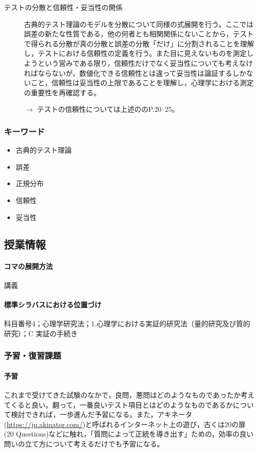 \begin{description}
\item[テストの分散と信頼性・妥当性の関係]古典的テスト理論のモデルを分散について同様の式展開を行う。ここでは誤差の新たな性質である，他の何者とも相関関係にないことから，テストで得られる分散が真の分散と誤差の分散「だけ」に分割されることを理解し，テストにおける信頼性の定義を行う。また目に見えないものを測定しようという営みである限り，信頼性だけでなく妥当性についても考えなければならないが，数値化できる信頼性とは違って妥当性は論証するしかないこと，信頼性は妥当性の上限であることを理解し，心理学における測定の重要性を再確認する。
\begin{flushright}
    $\to$ テストの信頼性については上述の\citet{kosugi2016b}のP.20--25。
\end{flushright}

\end{description}
\subsubsection{キーワード}
\begin{itemize}
\item 古典的テスト理論
\item 誤差
\item 正規分布
\item 信頼性
\item 妥当性
\end{itemize}
\subsection{授業情報}
\paragraph{コマの展開方法}
講義
\paragraph{標準シラバスにおける位置づけ}
科目番号4；心理学研究法；1.心理学における実証的研究法（量的研究及び質的研究）；C 実証の手続き
\subsubsection{予習・復習課題}
\paragraph{予習}
これまで受けてきた試験のなかで，良問，悪問はどのようなものであったか考えてくると良い。翻って，一番良いテスト項目とはどのようなものであるかについて検討できれば，一歩進んだ予習になる。また，アキネータ(\url{https://jp.akinator.com/})と呼ばれるインターネット上の遊び，古くは20の扉(20 Questions)などに触れ，「質問によって正統を導き出す」ための，効率の良い問いの立て方について考えるだけでも予習になる。
